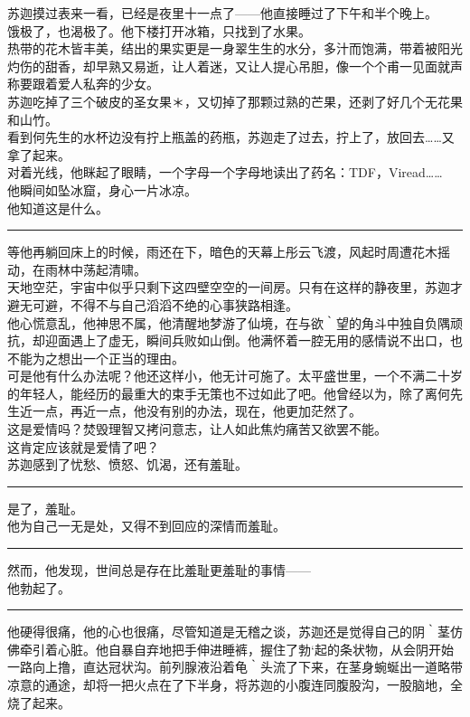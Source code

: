 \documentclass[oneside,11pt]{memoir} %
\begin{document}
\begin{CJK}{UTF8}{gbsn}
    苏迦摸过表来一看，已经是夜里十一点了——他直接睡过了下午和半个晚上。\\\indent 
    饿极了，也渴极了。他下楼打开冰箱，只找到了水果。\\\indent
    热带的花木皆丰美，结出的果实更是一身翠生生的水分，多汁而饱满，带着被阳光灼伤的甜香，却早熟又易逝，让人着迷，又让人提心吊胆，像一个个甫一见面就声称要跟着爱人私奔的少女。\\\indent
    苏迦吃掉了三个破皮的圣女果＊，又切掉了那颗过熟的芒果，还剥了好几个无花果和山竹。\\\indent
    看到何先生的水杯边没有拧上瓶盖的药瓶，苏迦走了过去，拧上了，放回去……又拿了起来。\\\indent
    对着光线，他眯起了眼睛，一个字母一个字母地读出了药名：TDF，Viread……\\\indent
    他瞬间如坠冰窟，身心一片冰凉。\\\indent
    他知道这是什么。\\\indent
\rule{-3pt}{30pt}
    等他再躺回床上的时候，雨还在下，暗色的天幕上彤云飞渡，风起时周遭花木摇动，在雨林中荡起清啸。\\\indent
    天地空茫，宇宙中似乎只剩下这四壁空空的一间房。只有在这样的静夜里，苏迦才避无可避，不得不与自己滔滔不绝的心事狭路相逢。\\\indent
    他心慌意乱，他神思不属，他清醒地梦游了仙境，在与欲｀望的角斗中独自负隅顽抗，却迎面遇上了虚无，瞬间兵败如山倒。他满怀着一腔无用的感情说不出口，也不能为之想出一个正当的理由。\\\indent
    可是他有什么办法呢？他还这样小，他无计可施了。太平盛世里，一个不满二十岁的年轻人，能经历的最重大的束手无策也不过如此了吧。他曾经以为，除了离何先生近一点，再近一点，他没有别的办法，现在，他更加茫然了。\\\indent
    这是爱情吗？焚毁理智又拷问意志，让人如此焦灼痛苦又欲罢不能。\\\indent
    这肯定应该就是爱情了吧？\\\indent
    苏迦感到了忧愁、愤怒、饥渴，还有羞耻。\\\indent
\rule{-3pt}{30pt}
    是了，羞耻。\\\indent
    他为自己一无是处，又得不到回应的深情而羞耻。\\\indent
\rule{-3pt}{30pt}
    然而，他发现，世间总是存在比羞耻更羞耻的事情——\\\indent
    他勃起了。\\\indent
\rule{-3pt}{30pt}
    他硬得很痛，他的心也很痛，尽管知道是无稽之谈，苏迦还是觉得自己的阴｀茎仿佛牵引着心脏。他自暴自弃地把手伸进睡裤，握住了勃`起的条状物，从会阴开始一路向上撸，直达冠状沟。前列腺液沿着龟｀头流了下来，在茎身蜿蜒出一道略带凉意的通途，却将一把火点在了下半身，将苏迦的小腹连同腹股沟，一股脑地，全烧了起来。\\\indent

\end{CJK}
\end{document}
